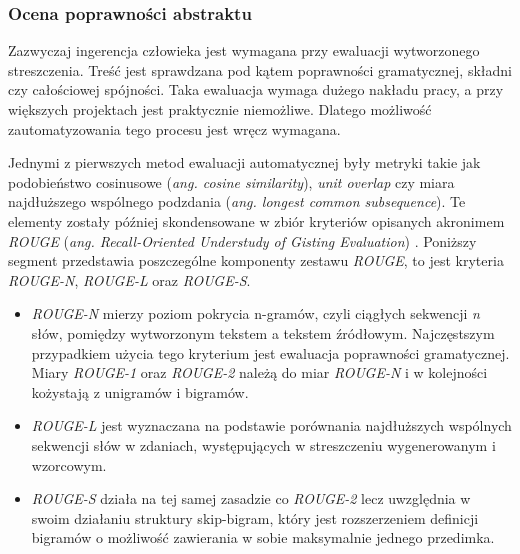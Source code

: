\documentclass[12pt,a4paper,twoside]{article}
\begin{document}
\subsubsection{Ocena poprawności abstraktu}
Zazwyczaj ingerencja człowieka jest wymagana przy ewaluacji wytworzonego streszczenia. Treść jest sprawdzana pod kątem poprawności gramatycznej, składni czy całościowej spójności. Taka ewaluacja wymaga dużego nakładu pracy, a przy większych projektach jest praktycznie niemożliwe. Dlatego możliwość zautomatyzowania tego procesu jest wręcz wymagana.\par
Jednymi z pierwszych metod ewaluacji automatycznej były metryki takie jak podobieństwo cosinusowe (\textit{ang. cosine similarity}), \textit{unit overlap} czy miara najdłuższego wspólnego podzdania (\textit{ang. longest common subsequence}). Te elementy zostały później skondensowane w zbiór kryteriów opisanych akronimem \textit{ROUGE} (\textit{ang. Recall-Oriented Understudy of Gisting Evaluation}) \cite{rouge}. Poniższy segment przedstawia poszczególne komponenty zestawu \textit{ROUGE}, to jest kryteria \textit{ROUGE-N}, \textit{ROUGE-L} oraz \textit{ROUGE-S}.\par
\begin{itemize}
	\item \textit{ROUGE-N} mierzy poziom pokrycia n-gramów, czyli ciągłych sekwencji \textit{n} słów, pomiędzy wytworzonym tekstem a tekstem źródłowym. Najczęstszym przypadkiem użycia tego kryterium jest ewaluacja poprawności gramatycznej. Miary \textit{ROUGE-1} oraz \textit{ROUGE-2} należą do miar \textit{ROUGE-N} i w kolejności kożystają z unigramów i bigramów.
	\item \textit{ROUGE-L} jest wyznaczana na podstawie porównania najdłuższych wspólnych sekwencji słów w zdaniach, występujących w streszczeniu wygenerowanym i wzorcowym. 
	\item \textit{ROUGE-S} działa na tej samej zasadzie co \textit{ROUGE-2} lecz uwzględnia w swoim działaniu struktury skip-bigram, który jest rozszerzeniem definicji bigramów o możliwość zawierania w sobie maksymalnie jednego przedimka.
\end{itemize}
\end{document}
